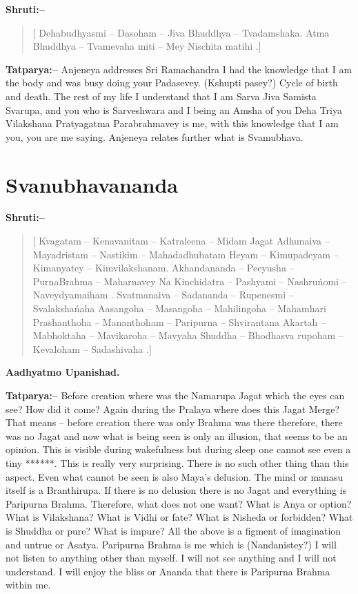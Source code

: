 \textbf{Shruti:–}

\begin{verse}
[ Dehabudhyasmi – Dasoham – Jiva Bhuddhya – Tvadamshaka.  Atma Bhuddhya – Tvamevaha miti – Mey Nischita matihi .]
\end{verse}

\textbf{Tatparya:–} Anjeneya addresses Sri Ramachandra I had the knowledge that I am the body and was busy doing your Padasevey. (Kshupti pasey?) Cycle of birth and death. The rest of my life I understand that I am Sarva Jiva Samista Svarupa, and you who is Sarveshwara and I being an Amsha of you Deha Triya Vilakshana Pratyagatma Parabrahmavey is me, with this knowledge that I am you, you are me saying. Anjeneya relates further what is Svamubhava.

\chapter{Svanubhavananda}

\textbf{Shruti:–}

\begin{verse}
[ Kvagatam – Kenavanitam – Katraleena – Midam Jagat  Adhunaiva – Mayadristam – Nastikim – Mahadadhubatam  Heyam – Kimupadeyam – Kimanyatey – Kimvilakshanam.  Akhandananda – Peeyusha – PurnaBrahma – Maharnavey  Na Kinchidatra – Pashyami – Nashruńomi – Naveydyamaiham . Svatmanaiva – Sadananda – Rupenesmi – Svalakshańaha  Aasangoha – Masangoha – Mahilingoha – Mahamhari  Prashanthoha – Mananthoham – Paripurna – Shvirantana  Akartah – Mabhoktaha – Mavikaroha – Mavyaha  Shuddha – Bhodhasva rupoham – Kevaloham – Sadashivaha .]
\end{verse}

\begin{flushright}
\textbf{Aadhyatmo Upanishad.}
\end{flushright}

\textbf{Tatparya:–} Before creation where was the Namarupa Jagat which the eyes can see? How did it come? Again during the Pralaya where does this Jagat Merge? That means – before creation there was only Brahma was there therefore, there was no Jagat and now what is being seen is only an illusion, that seems to be an opinion. This is visible during wakefulness but during sleep one cannot see even a tiny ******. This is really very surprising. There is no such other thing than this aspect. Even what cannot be seen is also Maya's delusion. The mind or manasu itself is a Branthirupa. If there is no delusion there is no Jagat and everything is Paripurna Brahma. Therefore, what does not one want? What is Anya or option? What is Vilakshana? What is Vidhi or fate? What is Nisheda or forbidden? What is Shuddha or pure? What is impure? All the above is a figment of imagination and untrue or Asatya. Paripurna Brahma is me which is (Nandanistey?) I will not listen to anything other than myself. I will not see anything and I will not understand. I will enjoy the bliss or Ananda that there is Paripurna Brahma within me.

